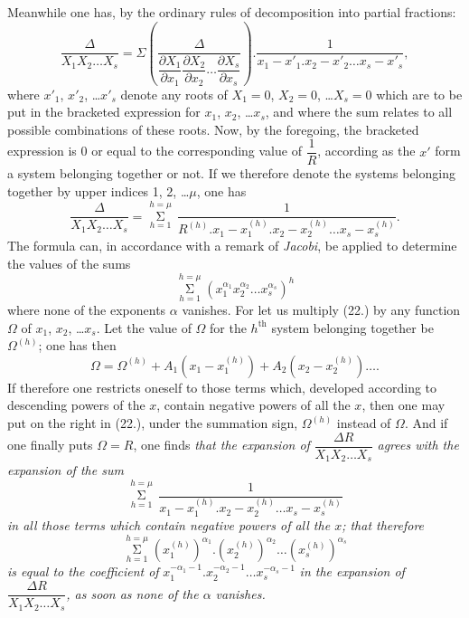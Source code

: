 \documentclass{article}
\begin{document}
Meanwhile one has, by the ordinary rules of decomposition into partial fractions:
\[
\frac{\Delta}{X_{1}X_{2}\ldots X_{s}} = \Sigma\left(\frac{\Delta}{\dfrac{\partial X_{1}}{\partial x_{1}}\dfrac{\partial X_{2}}{\partial x_{2}}\ldots\dfrac{\partial X_{s}}{\partial x_{s}}}\right).\frac{1}{x_{1}-x'_{1}.x_{2}-x'_{2}\ldots x_{s}-x'_{s}},
\]
where $x'_{1}$, $x'_{2}$, \ldots $x'_{s}$ denote any roots of $X_{1}=0$, $X_{2}=0$, \ldots $X_{s}=0$ which are to be put in the bracketed expression for $x_{1}$, $x_{2}$, \ldots $x_{s}$, and where the sum relates to all possible combinations of these roots. Now, by the foregoing, the bracketed expression is 0 or equal to the corresponding value of $\dfrac{1}{R}$, according as the $x'$ form a system belonging together or not. If we therefore denote the systems belonging together by upper indices 1, 2, \ldots $\mu$, one has
\[
\frac{\Delta}{X_{1}X_{2}\ldots X_{s}} = \mathop{\Sigma}\limits_{h=1}^{h=\mu}\,\frac{1}{R^{(h)}.x_{1}-x_{1}^{(h)}.x_{2}-x_{2}^{(h)}\ldots x_{s}-x_{s}^{(h)}}. \tag{22.}
\]
The formula can, in accordance with a remark of \emph{Jacobi}, be applied to determine the values of the sums
\[
\mathop{\Sigma}\limits_{h=1}^{h=\mu}\left(x_{1}^{\alpha_{1}}x_{2}^{\alpha_{2}}\ldots x_{s}^{\alpha_{s}}\right)^{h}
\]
where none of the exponents $\alpha$ vanishes. For let us multiply (22.) by any function $\Omega$ of $x_{1}$, $x_{2}$, \ldots $x_{s}$. Let the value of $\Omega$ for the $h^{\text{th}}$ system belonging together be $\Omega^{(h)}$; one has then
\[
\Omega = \Omega^{(h)}+A_{1}(x_{1}-x_{1}^{(h)})+A_{2}(x_{2}-x_{2}^{(h)})\ldots.
\]
If therefore one restricts oneself to those terms which, developed according to descending powers of the $x$, contain negative powers of all the $x$, then one may put on the right in (22.), under the summation sign, $\Omega^{(h)}$ instead of $\Omega$. And if one finally puts $\Omega=R$, one finds \emph{that the expansion of} $\dfrac{\Delta R}{X_{1}X_{2}\ldots X_{s}}$ \emph{agrees with the expansion of the sum}
\[
\mathop{\Sigma}\limits_{h=1}^{h=\mu}\,\frac{1}{x_{1}-x_{1}^{(h)}.x_{2}-x_{2}^{(h)}\ldots x_{s}-x_{s}^{(h)}}
\]
\emph{in all those terms which contain negative powers of all the $x$; that therefore}
\[
\mathop{\Sigma}\limits_{h=1}^{h=\mu}\left(x_{1}^{(h)}\right)^{\alpha_{1}}.\left(x_{2}^{(h)}\right)^{\alpha_{2}}\ldots\left(x_{s}^{(h)}\right)^{\alpha_{s}}
\]
\emph{is equal to the coefficient of} $x_{1}^{-\alpha_{1}-1}.x_{2}^{-\alpha_{2}-1}\ldots x_{s}^{-\alpha_{s}-1}$ \emph{in the expansion of} $\dfrac{\Delta R}{X_{1}X_{2}\ldots X_{s}}$\emph{, as soon as none of the $\alpha$ vanishes.}
\end{document}
